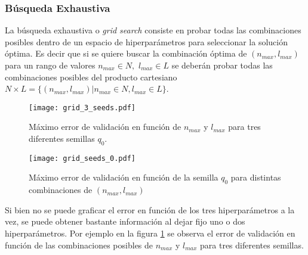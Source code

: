 \subsubsection*{Búsqueda Exhaustiva}
La búsqueda exhaustiva o \textit{grid search} consiste en probar todas las combinaciones posibles dentro de un espacio de hiperparámetros para seleccionar la solución óptima. Es decir que si se quiere buscar la combinación óptima de $(n_{max}, l_{max})$ para un rango de valores $n_{max} \in N,$ $l_{max} \in L$ se deberán probar todas las combinaciones posibles del producto cartesiano $N \times L = \{(n_{max}, l_{max}) | n_{max} \in N, l_{max} \in L\}$. 

\begin{figure}[h!]
\centering
\texttt{[image: grid\_3\_seeds.pdf]}
\caption{Máximo error de validación en función de $n_{max}$ y $l_{max}$ para tres diferentes semillas $q_0$. }
\label{fig:grid_3_seeds}
\end{figure}

\begin{figure}[h!]
\centering
\texttt{[image: grid\_seeds\_0.pdf]}
\caption{Máximo error de validación en función de la semilla $q_0$ para distintas combinaciones de $(n_{max}, l_{max})$}
\label{fig:grid_seed_0}
\end{figure}


 


Si bien no se puede graficar el error en función de los tres hiperparámetros a la vez, se puede obtener bastante información al dejar fijo uno o dos hiperparámetros. Por ejemplo en la figura \ref{fig:grid_3_seeds} se observa el error de validación en función de las combinaciones posibles de  $n_{max}$ y $l_{max}$ para tres diferentes semillas. 

